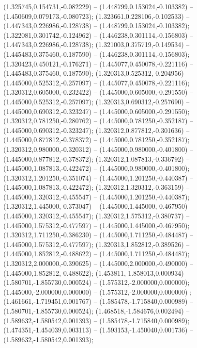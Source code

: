  (1.325745,0.154731,-0.082229) -- (1.448799,0.153024,-0.103382) -- (1.450609,0.079173,-0.080723);
 (1.323661,0.228106,-0.102533) -- (1.447343,0.226986,-0.128738) -- (1.448799,0.153024,-0.103382);
 (1.322081,0.301742,-0.124962) -- (1.446238,0.301114,-0.156803) -- (1.447343,0.226986,-0.128738);
 (1.321003,0.375719,-0.149534) -- (1.445483,0.375460,-0.187590) -- (1.446238,0.301114,-0.156803);
 (1.320423,0.450121,-0.176271) -- (1.445077,0.450078,-0.221116) -- (1.445483,0.375460,-0.187590);
 (1.320313,0.525312,-0.204956) -- (1.445000,0.525312,-0.257097) -- (1.445077,0.450078,-0.221116);
 (1.320312,0.605000,-0.232422) -- (1.445000,0.605000,-0.291550) -- (1.445000,0.525312,-0.257097);
 (1.320313,0.690312,-0.257690) -- (1.445000,0.690312,-0.323247) -- (1.445000,0.605000,-0.291550);
 (1.320312,0.781250,-0.280762) -- (1.445000,0.781250,-0.352187) -- (1.445000,0.690312,-0.323247);
 (1.320312,0.877812,-0.301636) -- (1.445000,0.877812,-0.378372) -- (1.445000,0.781250,-0.352187);
 (1.320312,0.980000,-0.320312) -- (1.445000,0.980000,-0.401800) -- (1.445000,0.877812,-0.378372);
 (1.320312,1.087813,-0.336792) -- (1.445000,1.087813,-0.422472) -- (1.445000,0.980000,-0.401800);
 (1.320312,1.201250,-0.351074) -- (1.445000,1.201250,-0.440387) -- (1.445000,1.087813,-0.422472);
 (1.320312,1.320312,-0.363159) -- (1.445000,1.320312,-0.455547) -- (1.445000,1.201250,-0.440387);
 (1.320312,1.445000,-0.373047) -- (1.445000,1.445000,-0.467950) -- (1.445000,1.320312,-0.455547);
 (1.320312,1.575312,-0.380737) -- (1.445000,1.575312,-0.477597) -- (1.445000,1.445000,-0.467950);
 (1.320312,1.711250,-0.386230) -- (1.445000,1.711250,-0.484487) -- (1.445000,1.575312,-0.477597);
 (1.320313,1.852812,-0.389526) -- (1.445000,1.852812,-0.488622) -- (1.445000,1.711250,-0.484487);
 (1.320312,2.000000,-0.390625) -- (1.445000,2.000000,-0.490000) -- (1.445000,1.852812,-0.488622);
 (1.453811,-1.858013,0.000934) -- (1.580701,-1.855730,0.000524) -- (1.575312,-2.000000,0.000000);
 (1.445000,-2.000000,0.000000) -- (1.575312,-2.000000,0.000000) ;
 (1.461661,-1.719451,0.001767) -- (1.585478,-1.715840,0.000989) -- (1.580701,-1.855730,0.000524);
 (1.468518,-1.584676,0.002494) -- (1.589632,-1.580542,0.001393) -- (1.585478,-1.715840,0.000989);
 (1.474351,-1.454039,0.003113) -- (1.593153,-1.450040,0.001736) -- (1.589632,-1.580542,0.001393);
